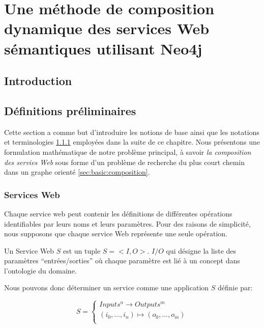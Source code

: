 \chapter{Une méthode de composition dynamique des services Web
  sémantiques utilisant Neo4j}
\label{ch:approche}

\section*{Introduction}
 

\newpage
\section{Définitions préliminaires}
\label{sec:basic-defs}
Cette section a comme but d'introduire les notions de base ainsi que
les notations et terminologies \ref{sec:basic:ws} employées dans la
suite de ce chapitre. Nous présentons une formulation
mathématique de notre problème principal, à savoir \textit{la
  composition des servies Web} sous forme d'un problème de recherche
du plus court chemin dans un graphe orienté
\ref{sec:basic:composition}.\medskip

  \subsection{Services Web}
  \label{sec:basic:ws}
  Chaque service web peut contenir les définitions de différentes
  opérations identifiables par leurs noms et leurs paramètres. 
  Pour des raisons de simplicité, nous supposons que chaque service Web
  représente une seule opération.

  \begin{mydef}
    Un Service Web $S$ est un tuple $S = <I,O>$. $I/O$ qui désigne la
    liste des paramètres ``entrées/sorties'' où chaque paramètre est
    lié à un concept dans l'ontologie du domaine.
   \end{mydef}

  

  Nous pouvons donc déterminer un service comme une application $S$
  définie par:

   \[ S =
     \begin{cases}
       Inputs^n  \to Outputs^m \\
       (i_0, ..., i_n ) \mapsto (o_0, ..., o_m)\\
     \end{cases}
   \]\medskip

